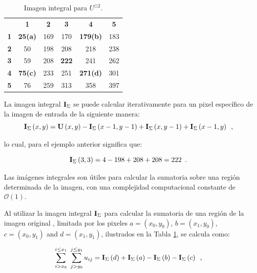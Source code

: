 \begin{table}
\caption{Imagen integral para $U^{\odot2}$.\label{table:integralcuad}}
\begin{center}
\renewcommand{\arraystretch}{1.4}
\setlength\tabcolsep{3pt}
{
\begin{tabular}{cc|ccc|c}
 & \multicolumn{1}{c}{\textbf{1}} & \textbf{2} & \textbf{3} & \multicolumn{1}{c}{\textbf{4}} & \textbf{5}\tabularnewline
\textbf{1} & \multicolumn{1}{c}{\textbf{25(a)}} & 169 & 170 & \multicolumn{1}{c}{\textbf{179(b)}} & 183\tabularnewline
\cline{3-5} 
\textbf{2} & 50 & 198 & 208 & 218 & 238\tabularnewline
\textbf{3} & 59 & 208 & \textbf{222} & 241 & 262\tabularnewline
\textbf{4} & \textbf{75(c)} & 233 & 251 & \textbf{271(d)} & 301\tabularnewline
\cline{3-5} 
\textbf{5} & \multicolumn{1}{c}{76} & 259 & 313 & \multicolumn{1}{c}{358} & 397\tabularnewline
\end{tabular}
}
\par\end{center}
\end{table}


La imagen integral $\mathbf{I}_{\Sigma}$ se puede calcular iterativamente para un pixel específico de la imagen de entrada  de la siguiente manera: 
\begin{equation}
\mathbf{I}_{\Sigma}\left(x,y\right)=\mathbf{U}\left(x,y\right)-\mathbf{I}_{\Sigma}\left(x-1,y-1\right)+\mathbf{I}_{\Sigma}\left(x,y-1\right)
+\mathbf{I}_{\Sigma}\left(x-1,y\right) \enspace ,
\end{equation}

lo cual, para el ejemplo anterior significa que:

\begin{equation}
\mathbf{I}_{\Sigma}\left(3,3\right)=4-198+208+208=222 \enspace .
\end{equation}

Las imágenes integrales son útiles para calcular la sumatoria sobre una región determinada de la imagen, con una complejidad computacional constante de $\mathcal{O}(1)$. 

Al utilizar la imagen integral $\mathbf{I}_{\Sigma}$ para calcular la sumatoria de una región de la imagen original , limitada por los pixeles $a=\left(x_{0},y_{0}\right)$,
$b=\left(x_{1},y_{0}\right)$, $c=\left(x_{0},y_{1}\right)$ and $d=\left(x_{1},y_{1}\right)$, ilustrados en la Tabla \ref{table:integralcuad}, se calcula como: 

\begin{equation}
\sum_{i>x_{0}}^{i\leq x_{1}}~\sum_{j>y_{0}}^{j\leq y_{1}}u_{ij}=\mathbf{I}_{\Sigma}\left(d\right)+\mathbf{I}_{\Sigma}\left(a\right)-\mathbf{I}_{\Sigma}\left(b\right)-\mathbf{I}_{\Sigma}\left(c\right) \enspace ,
\end{equation}

